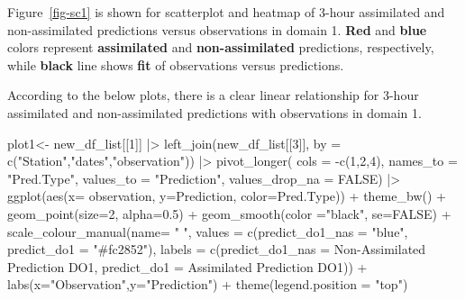 \documentclass[
  letterpaper,
  DIV=11,
  numbers=noendperiod,
  abstract]{scrartcl}
\newenvironment{Shaded}{\begin{snugshade}}{\end{snugshade}}
\newcommand{\AttributeTok}[1]{\textcolor[rgb]{0.40,0.45,0.13}{#1}}
\newcommand{\ConstantTok}[1]{\textcolor[rgb]{0.56,0.35,0.01}{#1}}
\newcommand{\DecValTok}[1]{\textcolor[rgb]{0.68,0.00,0.00}{#1}}
\newcommand{\FloatTok}[1]{\textcolor[rgb]{0.68,0.00,0.00}{#1}}
\newcommand{\FunctionTok}[1]{\textcolor[rgb]{0.28,0.35,0.67}{#1}}
\newcommand{\NormalTok}[1]{\textcolor[rgb]{0.00,0.23,0.31}{#1}}
\newcommand{\OtherTok}[1]{\textcolor[rgb]{0.00,0.23,0.31}{#1}}
\newcommand{\SpecialCharTok}[1]{\textcolor[rgb]{0.37,0.37,0.37}{#1}}
\newcommand{\StringTok}[1]{\textcolor[rgb]{0.13,0.47,0.30}{#1}}
\begin{document}
Figure~\ref{fig-sc1} is shown for scatterplot and heatmap of 3-hour
assimilated and non-assimilated predictions versus observations in
domain 1. \textbf{Red} and \textbf{blue} colors represent
\textbf{assimilated} and \textbf{non-assimilated} predictions,
respectively, while \textbf{black} line shows \textbf{fit} of
observations versus predictions.

According to the below plots, there is a clear linear relationship for
3-hour assimilated and non-assimilated predictions with observations in
domain 1.

\begin{Shaded}
\begin{Highlighting}[]
\NormalTok{plot1}\OtherTok{\textless{}{-}} 
\NormalTok{  new\_df\_list[[}\DecValTok{1}\NormalTok{]] }\SpecialCharTok{|\textgreater{}}        
    \FunctionTok{left\_join}\NormalTok{(new\_df\_list[[}\DecValTok{3}\NormalTok{]], }\AttributeTok{by =} \FunctionTok{c}\NormalTok{(}\StringTok{"Station"}\NormalTok{,}\StringTok{"dates"}\NormalTok{,}\StringTok{"observation"}\NormalTok{)) }\SpecialCharTok{|\textgreater{}} 
      \FunctionTok{pivot\_longer}\NormalTok{(}
        \AttributeTok{cols =} \SpecialCharTok{{-}}\FunctionTok{c}\NormalTok{(}\DecValTok{1}\NormalTok{,}\DecValTok{2}\NormalTok{,}\DecValTok{4}\NormalTok{),}
        \AttributeTok{names\_to =} \StringTok{"Pred.Type"}\NormalTok{,}
        \AttributeTok{values\_to =} \StringTok{"Prediction"}\NormalTok{,}
        \AttributeTok{values\_drop\_na =} \ConstantTok{FALSE}\NormalTok{) }\SpecialCharTok{|\textgreater{}}
\FunctionTok{ggplot}\NormalTok{(}\FunctionTok{aes}\NormalTok{(}\AttributeTok{x=}\NormalTok{ observation, }\AttributeTok{y=}\NormalTok{Prediction, }\AttributeTok{color=}\NormalTok{Pred.Type)) }\SpecialCharTok{+}   
  \FunctionTok{theme\_bw}\NormalTok{() }\SpecialCharTok{+}
  \FunctionTok{geom\_point}\NormalTok{(}\AttributeTok{size=}\DecValTok{2}\NormalTok{, }\AttributeTok{alpha=}\FloatTok{0.5}\NormalTok{) }\SpecialCharTok{+}   
  \FunctionTok{geom\_smooth}\NormalTok{(}\AttributeTok{color =}\StringTok{"black"}\NormalTok{, }\AttributeTok{se=}\ConstantTok{FALSE}\NormalTok{) }\SpecialCharTok{+}
  \FunctionTok{scale\_colour\_manual}\NormalTok{(}\AttributeTok{name=} \StringTok{" "}\NormalTok{, }
          \AttributeTok{values =} \FunctionTok{c}\NormalTok{(}\StringTok{\textquotesingle{}predict\_do1\_nas\textquotesingle{}} \OtherTok{=} \StringTok{"blue"}\NormalTok{,}
                     \StringTok{\textquotesingle{}predict\_do1\textquotesingle{}} \OtherTok{=} \StringTok{"\#fc2852"}\NormalTok{),}
          \AttributeTok{labels =} \FunctionTok{c}\NormalTok{(}\StringTok{\textquotesingle{}predict\_do1\_nas\textquotesingle{}} \OtherTok{=} \StringTok{\textquotesingle{}Non{-}Assimilated Prediction DO1\textquotesingle{}}\NormalTok{,}
                     \StringTok{\textquotesingle{}predict\_do1\textquotesingle{}} \OtherTok{=} \StringTok{\textquotesingle{}Assimilated Prediction DO1\textquotesingle{}}\NormalTok{)) }\SpecialCharTok{+}
  \FunctionTok{labs}\NormalTok{(}\AttributeTok{x=}\StringTok{"Observation"}\NormalTok{,}\AttributeTok{y=}\StringTok{"Prediction"}\NormalTok{) }\SpecialCharTok{+} \FunctionTok{theme}\NormalTok{(}\AttributeTok{legend.position =} \StringTok{"top"}\NormalTok{)}


\end{Highlighting}
\end{Shaded}
\end{document}

